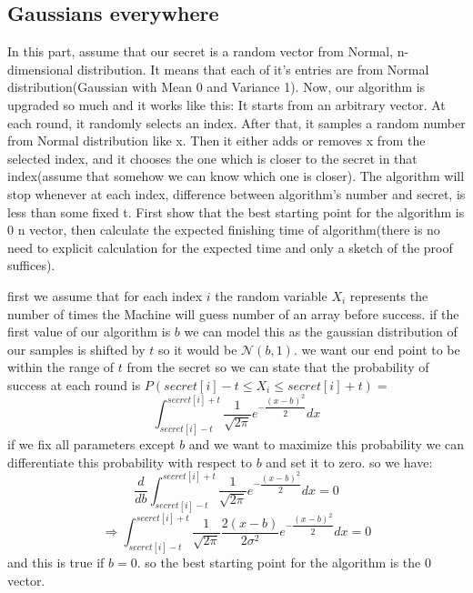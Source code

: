 \subsection{ Gaussians everywhere}
In this part, assume that our secret is a random vector from Normal, n-dimensional distribution.
It means that each of it’s entries are from Normal distribution(Gaussian with Mean 0 and
Variance 1). Now, our algorithm is upgraded so much and it works like this: It starts from
an arbitrary vector. At each round, it randomly selects an index. After that, it samples a
random number from Normal distribution like x. Then it either adds or removes x from the
selected index, and it chooses the one which is closer to the secret in that index(assume that
somehow we can know which one is closer). The algorithm will stop whenever at each index,
difference between algorithm’s number and secret, is less than some fixed t. First show that
the best starting point for the algorithm is 0
n vector, then calculate the expected finishing time
of algorithm(there is no need to explicit calculation for the expected time and only a sketch of
the proof suffices).
\begin{qsolve}
	\begin{qsolve}[]
		first we assume that for each index $i$ the random variable $X_i$ represents the number of times the Machine will guess number of an array before success. if the first value of our algorithm is $b$ we can model this as the gaussian distribution of our samples is shifted by $t$ so it would be $\mathcal{N}(b,1)$. we want our end point to be within the range of $t$ from the secret so we can state that the probability of success at each round is $P(secret[i] - t \leq X_i \leq secret[i] + t) =$
		$$\int_{secret[i] - t}^{secret[i] + t} \dfrac{1}{\sqrt{2\pi}}e^{-\dfrac{(x-b)^2}{2}}dx$$
		if we fix all parameters except $b$ and we want to maximize this probability we can differentiate this probability with respect to $b$ and set it to zero. so we have:
		\splitqsolve[\splitqsolve]
		$$\dfrac{d}{db} \int_{secret[i] - t}^{secret[i] + t} \dfrac{1}{\sqrt{2\pi}}e^{-\dfrac{(x-b)^2}{2}}dx = 0$$
		$$\Rightarrow \int_{secret[i] - t}^{secret[i] + t} \dfrac{1}{\sqrt{2\pi}}\dfrac{2(x-b)}{2\sigma^2}e^{-\dfrac{(x-b)^2}{2}}dx = 0$$
		and this is true if $b = 0$. so the best starting point for the algorithm is the 0 vector. 

	\end{qsolve}
\end{qsolve}




